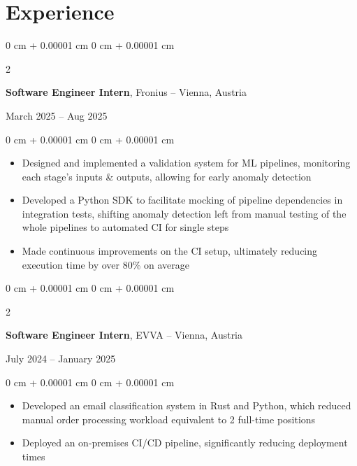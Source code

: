 \documentclass[10pt, letterpaper]{article}
\newenvironment{highlights}{
    \begin{itemize}[
        topsep=0.10 cm,
        parsep=0.10 cm,
        partopsep=0pt,
        itemsep=0pt,
        leftmargin=0 cm + 10pt
    ]
}{
    \end{itemize}
}
\newenvironment{onecolentry}{
    \begin{adjustwidth}{
        0 cm + 0.00001 cm
    }{
        0 cm + 0.00001 cm
    }
}{
    \end{adjustwidth}
}
\newenvironment{twocolentry}[2][]{
    \onecolentry
    \def\secondColumn{#2}
    \setcolumnwidth{\fill, 4.5 cm}
    \begin{paracol}{2}
}{
    \switchcolumn \raggedleft \secondColumn
    \end{paracol}
    \endonecolentry
}
\begin{document}
    \section{Experience}
        
    \begin{twocolentry}
        {March 2025 – Aug 2025}
        \textbf{Software Engineer Intern}, Fronius -- Vienna, Austria
    \end{twocolentry}

    \vspace{0.10 cm}
    
    \begin{onecolentry}
        \begin{highlights}
            \item Designed and implemented a validation system for ML pipelines, monitoring each stage's inputs \& outputs, allowing for early anomaly detection
            \item Developed a Python SDK to facilitate mocking of pipeline dependencies in integration tests, shifting anomaly detection left from manual testing of the whole pipelines to automated CI for single steps 
            \item Made continuous improvements on the CI setup, ultimately reducing execution time by over 80\% on average
        \end{highlights}
    \end{onecolentry}

    \vspace{0.2 cm}

    \begin{twocolentry}
        {July 2024 – January 2025}
        \textbf{Software Engineer Intern}, EVVA -- Vienna, Austria
    \end{twocolentry}

    \vspace{0.10 cm}
    
    \begin{onecolentry}
        \begin{highlights}
            \item Developed an email classification system in Rust and Python, which reduced manual order processing workload equivalent to 2 full-time positions
            \item Deployed an on-premises CI/CD pipeline, significantly reducing deployment times 
        \end{highlights}
    \end{onecolentry}
\end{document}
